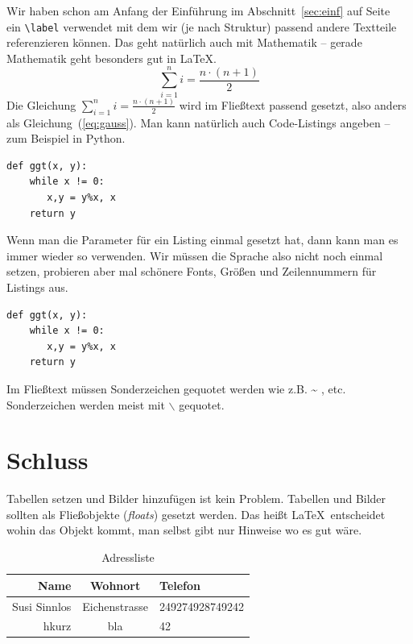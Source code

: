 \documentclass[11pt,a4paper]{article} %
\begin{document}
Wir haben schon am Anfang der Einführung im Abschnitt~\ref{sec:einf} 
auf Seite~\pageref{sec:einf} ein \verb|\label| verwendet mit dem wir
(je nach Struktur) passend andere Textteile referenzieren können.
Das geht natürlich auch mit Mathematik -- gerade Mathematik geht 
besonders gut in \LaTeX.
\begin{equation} \label{eq:gauss}
  \sum_{i=1}^n i = \frac{n \cdot (n+1)}{2}
\end{equation}
Die Gleichung $\sum_{i=1}^n i = \frac{n \cdot (n+1)}{2}$ wird
im Fließtext passend gesetzt, also anders als 
Gleichung~(\ref{eq:gauss}). 
Man kann natürlich auch Code-Listings angeben -- zum Beispiel in Python.
\lstset{language=python}
\begin{lstlisting}
def ggt(x, y):
    while x != 0:
       x,y = y%x, x
    return y
\end{lstlisting}
Wenn man die Parameter für ein Listing einmal gesetzt hat, dann kann
man es immer wieder so verwenden. 
Wir müssen die Sprache also nicht noch einmal setzen, probieren 
aber mal schönere Fonts, Größen und Zeilennummern für Listings aus.
\lstset{basicstyle=\sffamily, columns=[l]flexible, mathescape=true, showstringspaces=false, numbers=left, numberstyle=\tiny}
\begin{lstlisting}
def ggt(x, y):
    while x != 0:
       x,y = y%x, x
    return y
\end{lstlisting}
Im Fließtext müssen Sonderzeichen gequotet werden wie z.B. \~{} , etc. 
Sonderzeichen werden meist mit $\backslash$ gequotet.

\section{Schluss} \label{sec:schluss}

Tabellen setzen und Bilder hinzufügen ist kein Problem. 
Tabellen und Bilder sollten als Fließobjekte (\emph{floats}) gesetzt werden.
Das heißt \LaTeX\ entscheidet wohin das Objekt kommt, man selbst
gibt nur Hinweise wo es gut wäre.

\begin{table}[htbp] %
\centering
\begin{tabular}{|r|c|l|}
\hline
\textbf{Name} & \textbf{Wohnort} & \textbf{Telefon} \\ 
\hline
Susi Sinnlos & Eichenstrasse & 249274928749242 \\
hkurz & bla & 42 \\\hline
\end{tabular}
\caption{Adressliste}
\label{tab:meinetab}
\end{table}
\end{document}
